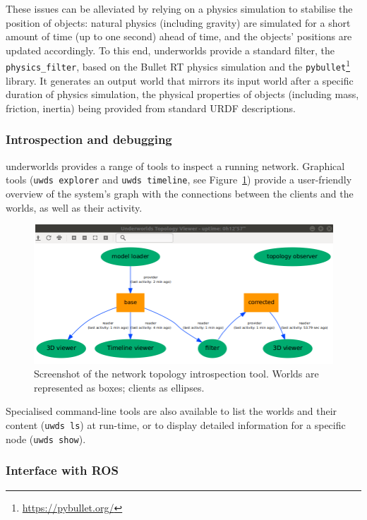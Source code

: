 \documentclass[letterpaper, 10pt, conference]{ieeeconf}
\newcommand{\uwds}{{\sc underworlds}\xspace}
\begin{document}
These issues can be alleviated by relying on a physics simulation to stabilise
the position of objects: natural physics (including gravity) are simulated for a
short amount of time (up to one second) ahead of time, and the objects'
positions are updated accordingly. To this end, \uwds provide a standard filter,
the {\tt physics\_filter}, based on the Bullet RT physics simulation and the
{\tt pybullet}\footnote{\url{https://pybullet.org/}} library. It generates an
output world that mirrors its input world after a specific duration of physics
simulation,  the physical properties of objects (including mass, friction,
inertia) being provided from standard URDF descriptions.

\subsubsection{Introspection and debugging}

\uwds provides a range of tools to inspect a running network. Graphical
tools ({\tt uwds explorer} and {\tt uwds timeline}, see Figure~\ref{fig|explorer})
provide a user-friendly overview of the system's graph with the connections
between the clients and the worlds, as well as their activity.

\begin{figure}
    \centering
    \includegraphics[width=\linewidth]{tools}
    \caption{Screenshot of the network topology introspection tool. Worlds are represented as boxes; clients as ellipses.}
    \label{fig|explorer}
\end{figure}

Specialised command-line tools are also available to list the worlds
and their content ({\tt uwds ls}) at run-time, or to display detailed information for a
specific node ({\tt uwds show}).

\subsubsection{Interface with ROS}
\end{document}
